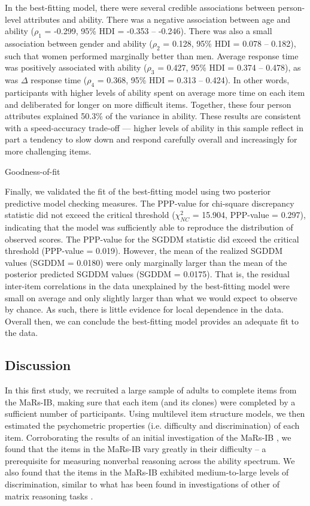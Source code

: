 \documentclass[a4paper,man,natbib]{apa6}
\makeatletter
\renewcommand{\subsubsection}{\@startsection{subsubsection}{3}
  {\z@}%
  {\b@level@two@skip}{\e@level@two@skip}%
  {\normalfont\normalsize\bfseries}}
\makeatother
\begin{document}
In the best-fitting model, there were several credible associations between person-level attributes and ability. There was a negative association between age and ability ($\rho_1$ = -0.299, 95\% HDI = -0.353 -- -0.246). There was also a small association between gender and ability ($\rho_2$ = 0.128, 95\% HDI = 0.078 -- 0.182), such that women performed marginally better than men. Average response time was positively associated with ability ($\rho_3$ = 0.427, 95\% HDI = 0.374 -- 0.478), as was $\Delta$ response time ($\rho_4$ = 0.368, 95\% HDI = 0.313 -- 0.424). In other words, participants with higher levels of ability spent on average more time on each item and deliberated for longer on more difficult items. Together, these four person attributes explained 50.3\% of the variance in ability. These results are consistent with a speed-accuracy trade-off --- higher levels of ability in this sample reflect in part a tendency to slow down and respond carefully overall and increasingly for more challenging items.  

\subsubsection{Goodness-of-fit}

Finally, we validated the fit of the best-fitting model using two posterior predictive model checking measures. The PPP-value for chi-square discrepancy statistic did not exceed the critical threshold ($\chi^2_{NC}$ = 15.904, PPP-value = 0.297), indicating that the model was sufficiently able to reproduce the distribution of observed scores. The PPP-value for the SGDDM statistic did exceed the critical threshold (PPP-value = 0.019). However, the mean of the realized SGDDM values (SGDDM = 0.0180) were only marginally larger than the mean of the posterior predicted SGDDM values (SGDDM = 0.0175). That is, the residual inter-item correlations in the data unexplained by the best-fitting model were small on average and only slightly larger than what we would expect to observe by chance. As such, there is little evidence for local dependence in the data. Overall then, we can conclude the best-fitting model provides an adequate fit to the data.

\subsection{Discussion}

In this first study, we recruited a large sample of adults to complete items from the MaRs-IB, making sure that each item (and its clones) were completed by a sufficient number of participants. Using multilevel item structure models, we then estimated the psychometric properties (i.e. difficulty and discrimination) of each item. Corroborating the results of an initial investigation of the MaRs-IB \citep{chierchia2019matrix}, we found that the items in the MaRs-IB vary greatly in their difficulty -- a prerequisite for measuring nonverbal reasoning across the ability spectrum. We also found that the items in the MaRs-IB exhibited medium-to-large levels of discrimination, similar to what has been found in investigations of other of matrix reasoning tasks \citep{chiesi2012using, chiesi2012item, van2013shortened}.
\end{document}
